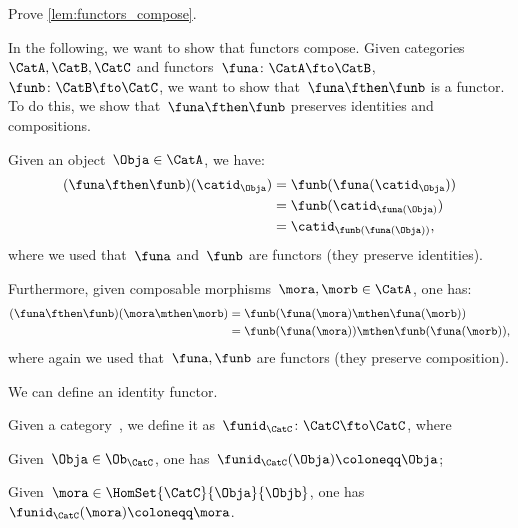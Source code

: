 \begin{exercise}
    Prove \cref{lem:functors_compose}.
\end{exercise}
\begin{solution}
    In the following, we want to show that functors compose.
    Given categories~$\CatA,\CatB,\CatC$ and functors~$\funa\colon \CatA\fto \CatB$,~$\funb \colon \CatB\fto \CatC$, we want to show that~$\funa\fthen\funb$ is a functor.
    To do this, we show that~$\funa\fthen\funb$ preserves identities and compositions.
    \begin{compactitem}
        \item Given an object~$\Obja\in \CatA$, we have:
              \begin{equation*}
                  \begin{aligned}
                      (\funa\fthen\funb)(\catid_\Obja)
                       & =\funb(\funa(\catid_\Obja))    \\
                       & =\funb(\catid_{\funa(\Obja)})  \\
                       & =\catid_{\funb(\funa(\Obja))},
                  \end{aligned}
              \end{equation*}
              where we used that~$\funa$ and~$\funb$ are functors (they preserve identities).
        \item Furthermore, given composable morphisms~$\mora,\morb\in \CatA$, one has:
              \begin{equation*}
                  \begin{aligned}
                      (\funa\fthen\funb)(\mora\mthen\morb)
                       & =\funb(\funa(\mora)\mthen \funa(\morb))         \\
                       & =\funb(\funa(\mora))\mthen \funb(\funa(\morb)),
                  \end{aligned}
              \end{equation*}
              where again we used that~$\funa,\funb$ are functors (they preserve composition).
    \end{compactitem}
\end{solution}

We can define an identity functor.

\begin{ctdefinition}
    \label{def:identity_functor}
    Given a category~\CatC, we define it as~$\funid_\CatC\colon \CatC \fto \CatC$, where
    \begin{compactitem}
        \item Given~$\Obja\in \Ob_\CatC$, one has~$\funid_\CatC(\Obja)\coloneqq \Obja$;
        \item Given~$\mora \in \HomSet{\CatC}{\Obja}{\Objb}$, one has~$\funid_\CatC(\mora)\coloneqq \mora$.
    \end{compactitem}
\end{ctdefinition}

